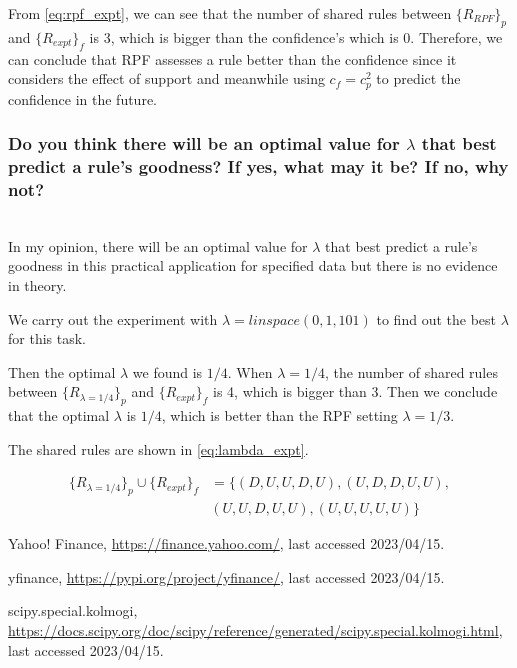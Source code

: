 \documentclass[runningheads]{llncs}
\begin{document}
From \eqref{eq:rpf_expt}, we can see that the number of shared rules between $\{R_{RPF}\}_p$ and $\{R_{expt}\}_f$ is 3, which is bigger than the confidence's which is 0. 
Therefore, we can conclude that RPF assesses a rule better than the confidence since it considers the effect of support and meanwhile using $c_f=c_p^2$ to predict the confidence in the future.


\subsubsection*{Do you think there will be an optimal value for $\lambda$ that best predict a rule's goodness? If yes, what may it be? If no, why not?}

\hfill\\
In my opinion, there will be an optimal value for $\lambda$ that best predict a rule's goodness in this practical application for specified data but there is no evidence in theory.

We carry out the experiment with $\lambda=linspace(0,1,101)$ to find out the best $\lambda$ for this task.

Then the optimal $\lambda$ we found is $1/4$. When $\lambda=1/4$, the number of shared rules between $\{R_{\lambda=1/4}\}_p$ and $\{R_{expt}\}_f$ is 4, which is bigger than 3. 
Then we conclude that the optimal $\lambda$ is $1/4$, which is better than the RPF setting $\lambda=1/3$.

The shared rules are shown in \eqref{eq:lambda_expt}.

\begin{equation}
    \label{eq:lambda_expt}
    \begin{aligned}
        \{R_{\lambda=1/4}\}_p\cup \{R_{expt}\}_f & = \{(D,U,U,D,U),(U,D,D,U,U),\\
        &(U,U,D,U,U),(U,U,U,U,U)\}
    \end{aligned}
\end{equation}

%
%
%
% 
% 
%
\begin{thebibliography}{8}
    Yahoo! Finance, \url{https://finance.yahoo.com/}, last accessed 2023/04/15.

    yfinance, \url{https://pypi.org/project/yfinance/}, last accessed 2023/04/15.

    scipy.special.kolmogi, \url{https://docs.scipy.org/doc/scipy/reference/generated/scipy.special.kolmogi.html}, last accessed 2023/04/15.

\end{thebibliography}
\end{document}
